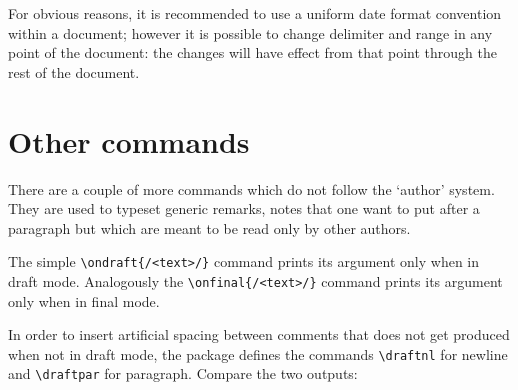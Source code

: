 \documentclass[11pt]{article}
\let\cmd=\lstinline
\def\cmdmp{\lstinline[style=mp]}
\newcommand{\doccmd}[2][]{%
	\marginpar[%
		\leavevmode%
		\raggedleft%
		\fbox{\cmdmp'#2'}%
		\scriptsize\it\ #1%
	]{%
		\leavevmode%
		\raggedright%
		\fbox{\cmdmp'#2'}%
		\scriptsize\it\ #1%
	}%
}
\begin{document}
For obvious reasons, it is recommended to use a uniform date format convention
within a document; however it is possible to change delimiter and range in any
point of the document: the changes will have effect from that point through the
rest of the document.

\section{Other commands}

There are a couple of more commands which do not follow the `author' system.
They are used to typeset generic remarks, notes that one want to put
after a paragraph but which are meant to be read only by other authors.

The simple \cmd'\ondraft{/<text>/}'\doccmd{\\ondraft} command prints its
argument only when in draft mode. Analogously the
\cmd'\onfinal{/<text>/}'\doccmd{\\onfinal} command prints its argument only when
in final mode.

In order to insert artificial spacing between comments that does not get produced
when not in draft mode, the package defines the commands
\cmd'\draftnl'\doccmd{\\draftnl} for newline and
\cmd'\draftpar'\doccmd{\\draftpar} for paragraph.
Compare the two outputs:\\
\begin{minipage}{.5\linewidth}
\begin{latexex}
\end{latexex}
\end{minipage}\hfill
\begin{minipage}{.4\linewidth}
\small
{}
\end{minipage}

\begin{minipage}{.5\linewidth}
\begin{latexex}
\draftnl
{}
\draftnl
{}
\end{latexex}
\end{minipage}\hfill
\begin{minipage}{.4\linewidth}
\small
{}\draftnl
{}\draftnl
{}
\end{minipage}
\end{document}

